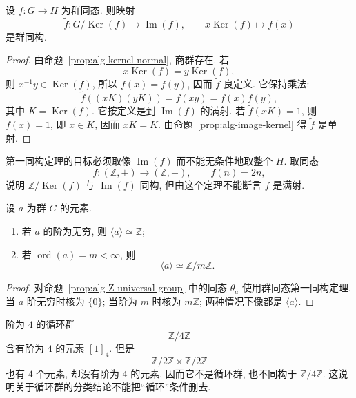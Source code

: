 \documentclass[usesamecnt, thmcnt=section, lang=cn, newtx, 10pt, scheme=chinese]{elegantbook}
\begin{document}
\begin{theorem}[群同态第一同构定理]\label{thm:alg-first-iso-group}
设 $f:G\to H$ 为群同态. 则映射
\[
 \widetilde f:G/\operatorname{Ker}(f)
 \longrightarrow \operatorname{Im}(f),
 \qquad
 x\operatorname{Ker}(f)\longmapsto f(x)
\]
是群同构.
\end{theorem}

\begin{proof}
由命题~\ref{prop:alg-kernel-normal}, 商群存在. 若
\[
 x\operatorname{Ker}(f)=y\operatorname{Ker}(f),
\]
则 $x^{-1}y\in\operatorname{Ker}(f)$, 所以 $f(x)=f(y)$, 因而 $\widetilde f$ 良定义. 它保持乘法:
\[
 \widetilde f((xK)(yK))=f(xy)=f(x)f(y),
\]
其中 $K=\operatorname{Ker}(f)$. 它按定义是到 $\operatorname{Im}(f)$ 的满射. 若 $\widetilde f(xK)=1$, 则 $f(x)=1$, 即 $x\in K$, 因而 $xK=K$. 由命题~\ref{prop:alg-image-kernel} 得 $\widetilde f$ 是单射.
\end{proof}

\begin{exercise}\label{ex:alg-first-iso-image}
第一同构定理的目标必须取像 $\operatorname{Im}(f)$ 而不能无条件地取整个 $H$. 取同态
\[
 f:(\mathbb Z,+)\to(\mathbb Z,+),\qquad f(n)=2n,
\]
说明 $\mathbb Z/\operatorname{Ker}(f)$ 与 $\operatorname{Im}(f)$ 同构, 但由这个定理不能断言 $f$ 是满射.
\end{exercise}

\begin{corollary}\label{cor:alg-cyclic-standard}
设 $a$ 为群 $G$ 的元素.
\begin{enumerate}[label=\rm(\arabic*)]
  \item 若 $a$ 的阶为无穷, 则 $\langle a\rangle\simeq\mathbb Z$;
  \item 若 $\operatorname{ord}(a)=m<\infty$, 则
  \[
   \langle a\rangle\simeq\mathbb Z/m\mathbb Z.
  \]
\end{enumerate}
\end{corollary}

\begin{proof}
对命题~\ref{prop:alg-Z-universal-group} 中的同态 $\theta_a$ 使用群同态第一同构定理. 当 $a$ 阶无穷时核为 $\{0\}$; 当阶为 $m$ 时核为 $m\mathbb Z$; 两种情况下像都是 $\langle a\rangle$.
\end{proof}

\begin{instance}
阶为 $4$ 的循环群
\[
 \mathbb Z/4\mathbb Z
\]
含有阶为 $4$ 的元素 $[1]_4$. 但是
\[
 \mathbb Z/2\mathbb Z\times\mathbb Z/2\mathbb Z
\]
也有 $4$ 个元素, 却没有阶为 $4$ 的元素. 因而它不是循环群, 也不同构于 $\mathbb Z/4\mathbb Z$. 这说明关于循环群的分类结论不能把``循环''条件删去.
\end{instance}
\end{document}
